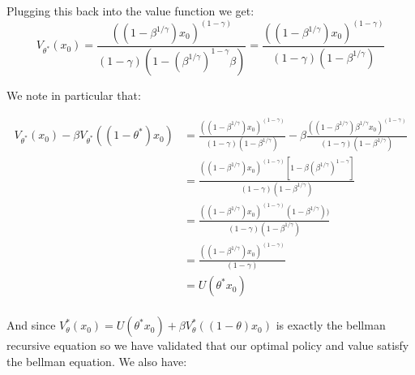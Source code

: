 \documentclass{article}[12pt]
\begin{document}
Plugging this back into the value function we get:
$$ V_{\theta^*}(x_0) =\frac{((1 - \beta^{1/\gamma}) x_0)^{(1-\gamma)}}{(1-\gamma)(1-(\beta^{1/\gamma})^{1-\gamma}\beta)} = \frac{((1 - \beta^{1/\gamma}) x_0)^{(1-\gamma)}}{(1-\gamma)(1-\beta^{1/\gamma})}$$

We note in particular that:


\begin{align*}
V_{\theta^*}(x_0) - \beta V_{\theta^*}((1-\theta^*)x_0) &= \frac{((1 - \beta^{1/\gamma}) x_0)^{(1-\gamma)}}{(1-\gamma)(1-\beta^{1/\gamma})} - \beta \frac{((1 - \beta^{1/\gamma}) \beta^{1/\gamma} x_0)^{(1-\gamma)}}{(1-\gamma)(1-\beta^{1/\gamma})}\\
&= \frac{((1 - \beta^{1/\gamma}) x_0)^{(1-\gamma)} [1 - \beta(\beta^{1/\gamma})^{1-\gamma}]}{(1-\gamma)(1-\beta^{1/\gamma})} \\
&= \frac{((1 - \beta^{1/\gamma}) x_0)^{(1-\gamma)} (1 - \beta^{1/\gamma}))}{(1-\gamma)(1-\beta^{1/\gamma})} \\
&= \frac{((1 - \beta^{1/\gamma}) x_0)^{(1-\gamma)}}{(1-\gamma)} \\
&= U(\theta^* x_0) \\
\end{align*} 

And since $V_\theta^*(x_0) = U(\theta^* x_0) + \beta V_\theta^*((1-\theta)x_0)$ is exactly the bellman recursive equation so we have validated that our optimal policy and value satisfy the bellman equation. We also have:
\end{document}
